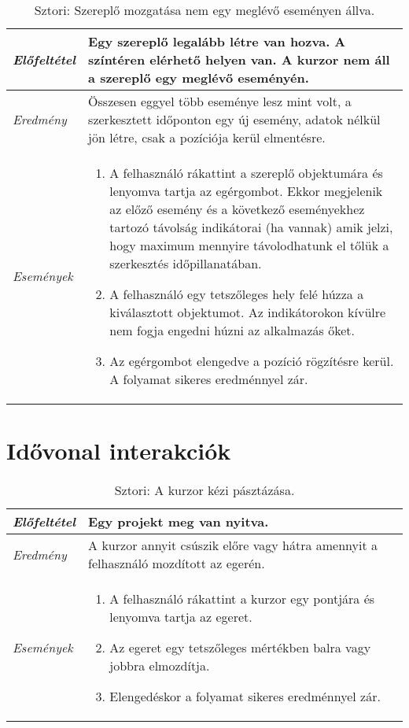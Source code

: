 \begin{table}[H]
	\centering
	\begin{tabular}{ | m{} | m{} | }
		\hline
		\emph{Előfeltétel} & Egy szereplő legalább létre van hozva. A színtéren elérhető helyen van. A kurzor nem áll a szereplő egy meglévő eseményén. \\
		\hline
		\emph{Eredmény} & Összesen eggyel több eseménye lesz mint volt, a szerkesztett időponton egy új esemény, adatok nélkül jön létre, csak a pozíciója kerül elmentésre. \\
		\hline
		\hline
		\emph{Események} &

		\begin{enumerate}[itemsep=-1ex]
			\item A felhasználó rákattint a szereplő objektumára és lenyomva tartja az egérgombot. Ekkor megjelenik az előző esemény és a következő eseményekhez tartozó távolság indikátorai (ha vannak) amik jelzi, hogy maximum mennyire távolodhatunk el tőlük a szerkesztés időpillanatában.
			\item A felhasználó egy tetszőleges hely felé húzza a kiválasztott objektumot. Az indikátorokon kívülre nem fogja engedni húzni az alkalmazás őket.
			\item Az egérgombot elengedve a pozíció rögzítésre kerül. A folyamat sikeres eredménnyel zár.
		\end{enumerate}
		\\
		\hline
	\end{tabular}
	\caption{Sztori: Szereplő mozgatása nem egy meglévő eseményen állva.}
	\label{tab:story-actor-move-not-on-event}
\end{table}



\section{Idővonal interakciók}

\begin{table}[H]
	\centering
	\begin{tabular}{ | m{} | m{} | }
		\hline
		\emph{Előfeltétel} & Egy projekt meg van nyitva. \\
		\hline
		\emph{Eredmény} & A kurzor annyit csúszik előre vagy hátra amennyit a felhasználó mozdított az egerén. \\
		\hline
		\hline
		\emph{Események} &
		\begin{enumerate}[itemsep=-1ex]
			\item A felhasználó rákattint a kurzor egy pontjára és lenyomva tartja az egeret.
			\item Az egeret egy tetszőleges mértékben balra vagy jobbra elmozdítja.
			\item Elengedéskor a folyamat sikeres eredménnyel zár.
		\end{enumerate}
		\\
		\hline
	\end{tabular}
	\caption{Sztori: A kurzor kézi pásztázása.}
	\label{tab:story-timeline-manual-pan-cursor}
\end{table}

